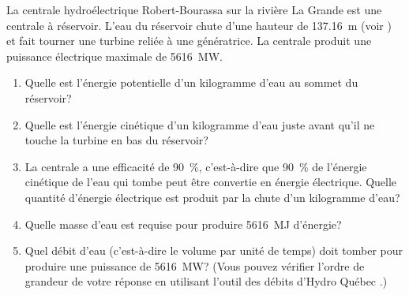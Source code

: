 \documentclass[nofonts]{tufte-handout}
\newif\ifsolution
\begin{document}
La centrale hydroélectrique Robert-Bourassa sur la rivière La Grande est une
centrale à réservoir. L'eau du réservoir chute d'une hauteur de
\qty{137.16}{\meter} (voir \cite{hydroquebec_centrales}) et fait tourner une turbine
reliée à une génératrice. La centrale produit une puissance électrique maximale
de \qty{5616}{\mega\watt}.

\begin{enumerate}[label=\alph*)]
  \item Quelle est l'énergie potentielle d'un kilogramme d'eau au sommet du réservoir?
  \item Quelle est l'énergie cinétique d'un kilogramme d'eau juste avant qu'il
    ne touche la turbine en bas du réservoir?
  \item La centrale a une efficacité de \qty{90}{\percent}, c'est-à-dire que
    \qty{90}{\percent} de l'énergie cinétique de l'eau qui tombe peut être
    convertie en énergie électrique. Quelle quantité d'énergie électrique est
    produit par la chute d'un kilogramme d'eau?
  \item Quelle masse d'eau est requise pour produire \qty{5616}{\mega\joule} d'énergie?
  \item Quel débit d'eau (c'est-à-dire le volume par unité de temps) doit
    tomber pour produire une puissance de \qty{5616}{\mega\watt}? (Vous pouvez
    vérifier l'ordre de grandeur de votre réponse en utilisant l'outil des
    débits d'Hydro Québec \cite{hydroquebec_debit}.)
\end{enumerate}

\ifsolution
\end{document}
